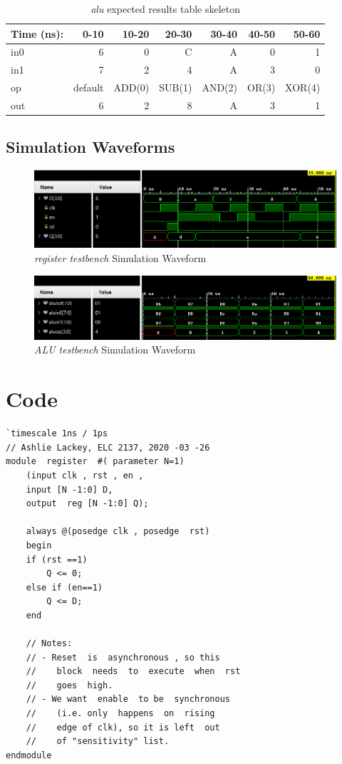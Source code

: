 \documentclass[11pt]{article}
\begin{document}
\begin{table}[ht]\centering
	\caption{\textit{alu} expected results table skeleton}
	\label{ALU:tbl:alu_ERT}\medskip
	\begin{tabular}{l|rrrrrr}
		Time (ns): & 0-10 & 10-20 & 20-30 & 30-40 & 40-50 & 50-60 \\
		\midrule
		in0 & 6  & 0 & C & A & 0 & 1 \\
		in1 & 7 & 2 & 4 & A & 3 & 0 \\
		op    & default & ADD(0) & SUB(1) & AND(2) & OR(3) & XOR(4) \\
		\midrule
		out & 6 & 2 & 8 & A & 3 & 1 \\
		\bottomrule
	\end{tabular}
\end{table}

\subsection*{Simulation Waveforms}
\begin{figure}[ht]\centering
	\includegraphics[width=1\textwidth]{register_test}
	\caption{\textit{register testbench} Simulation Waveform}
	\label{fig:sim_with_table}
\end{figure}

\begin{figure}[ht]\centering
	\includegraphics[width=1\textwidth]{alu_test}
	\caption{\textit{ALU testbench} Simulation Waveform}
	\label{fig:sim_with_table}
\end{figure}

\section*{Code}

\begin{lstlisting}[style=Verilog,caption= register Verilog Code,label=code:ex ]
`timescale 1ns / 1ps
// Ashlie Lackey, ELC 2137, 2020 -03 -26
module  register  #( parameter N=1)
	(input clk , rst , en ,
	input [N -1:0] D,
	output  reg [N -1:0] Q);
	
	always @(posedge clk , posedge  rst)
	begin
	if (rst ==1)
		Q <= 0;
	else if (en==1)
		Q <= D;
	end
	
	// Notes:
	// - Reset  is  asynchronous , so this
	//    block  needs  to  execute  when  rst
	//    goes  high.
	// - We want  enable  to be  synchronous
	//    (i.e. only  happens  on  rising
	//    edge of clk), so it is left  out
	//    of "sensitivity" list.
endmodule
\end{lstlisting}
\end{document}
